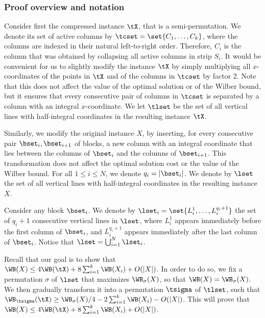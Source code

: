 \documentclass{toc}
\begin{document}
%
%
%
%
\subsubsection{Proof overview and notation}

%
%
%
%

Consider first the compressed instance $\tX$, that is a semi-permutation. We denote its set of active columns by $\tcset=\set{C_1,\ldots,C_k}$, where the columns are indexed in their natural left-to-right order. Therefore, $C_i$ is the column that was obtained by collapsing all active columns in strip $S_i$. %
%
%
%
%
It would be convenient for us to slightly modify the instance $\tX$ by simply multiplying all $x$-coordinates of the points in $\tX$ and of the columns in $\tcset$ by factor $2$. Note that this does not affect the value of the optimal solution or of the Wilber bound, but it ensures that every consecutive pair of columns in $\tcset$ is separated by a column with an integral $x$-coordinate. We let $\tlset$ be the set of all vertical lines with half-integral coordinates in the resulting instance $\tX$.

Similarly, we modify the original instance $X$, by inserting, for every consecutive pair $\bset_i,\bset_{i+1}$ of blocks, a new column with an integral coordinate that lies between the columns of $\bset_{i}$ and the columns of $\bset_{{i+1}}$. This transformation does not affect the optimal solution cost or the value of the Wilber bound. For all $1\leq i\leq N$, we denote $q_i=|\bset_i|$.
%
We denote by $\lset$ the set of all vertical lines with half-integral coordinates in the resulting instance $X$.

Consider any block $\bset_i$. We denote by $\lset_i=\set{L_i^1,\ldots,L_i^{q_i+1}}$ the set of $q_i+1$ consecutive vertical lines in $\lset$, where $L_i^1$ appears immediately before the first column of $\bset_i$, and $L_i^{q_i+1}$ appears immediately after the last column of $\bset_i$. Notice that $\lset=\bigcup_{i=1}^N\lset_i$.

Recall that our goal is to show that $\WB(X)\leq 4\WB(\tX)+8\sum_{i=1}^k\WB(X_i)+O(|X|)$. In order to do so, we fix a permutation $\sigma$ of $\lset$ that maximizes $\WB_{\sigma}(X)$, so that $\WB(X)=\WB_{\sigma}(X)$. We then gradually transform it into a permutation $\tsigma$ of $\tlset$, such that $\WB_{\tsigma}(\tX)\geq \WB_{\sigma}(X)/4-2\sum_{i=1}^k\WB(X_i)-O(|X|)$. This will prove that $\WB(X)\leq 4\WB(\tX)+8\sum_{i=1}^k\WB(X_i)+O(|X|)$.
\end{document}
